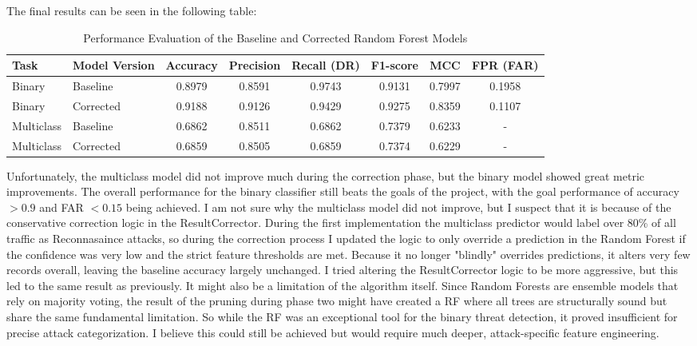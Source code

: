 The final results can be seen in the following table:
\begin{table}[htbp]
\centering
\caption{Performance Evaluation of the Baseline and Corrected Random Forest Models}
\label{tab:rf_metrics}
\begin{tabular}{l@{\hspace{0.3cm}}lcccccc}
\hline
\textbf{Task} & \textbf{Model Version} & \textbf{Accuracy} & \textbf{Precision} & \textbf{Recall (DR)} & \textbf{F1-score} & \textbf{MCC} & \textbf{FPR (FAR)} \\ \hline
Binary & Baseline & 0.8979 & 0.8591 & 0.9743 & 0.9131 & 0.7997 & 0.1958 \\
Binary & Corrected & 0.9188 & 0.9126 & 0.9429 & 0.9275 & 0.8359 & 0.1107 \\ \hline
Multiclass & Baseline & 0.6862 & 0.8511 & 0.6862 & 0.7379 & 0.6233 & - \\
Multiclass & Corrected & 0.6859 & 0.8505 & 0.6859 & 0.7374 & 0.6229 & - \\ \hline
\end{tabular}
\end{table}
Unfortunately, the multiclass model did not improve much during the correction phase, but the binary model showed great metric improvements. The overall performance for the binary classifier still beats the goals of the project, with the goal performance of accuracy $> 0.9$ and FAR $< 0.15$ being achieved.
I am not sure why the multiclass model did not improve, but I suspect that it is because of the conservative correction logic in the ResultCorrector. During the first implementation the multiclass predictor would label over 80\% of all traffic as Reconnasaince attacks, so during the correction process I updated the logic to only override a prediction in the Random Forest if the confidence was very low and the strict feature thresholds are met. Because it no longer "blindly" overrides predictions, it alters very few records overall, leaving the baseline accuracy largely unchanged.
I tried altering the ResultCorrector logic to be more aggressive, but this led to the same result as previously. It might also be a limitation of the algorithm itself.
Since Random Forests are ensemble models that rely on majority voting, the result of the pruning during phase two might have created a RF where all trees are structurally sound but share the same fundamental limitation. So while the RF was an exceptional tool for the binary threat detection, it proved insufficient for precise attack categorization. I believe this could still be achieved but would require much deeper, attack-specific feature engineering.
